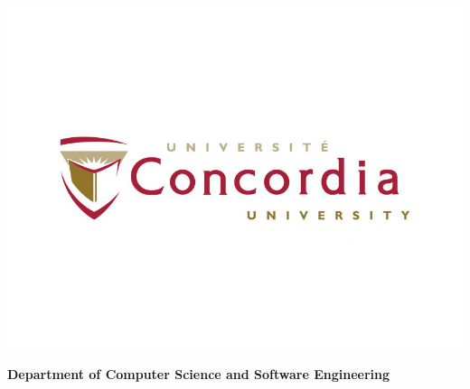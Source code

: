 \begin{titlepage}
\begin{center}
\includegraphics[width=0.45\linewidth]{TAS/media/Concordia-university-logo.jpg}

    

    {\large \textbf{Department of Computer Science and Software Engineering}\par}
    \vspace{0.4cm}

\end{center}
\vfill %
\clearpage
\end{titlepage}
